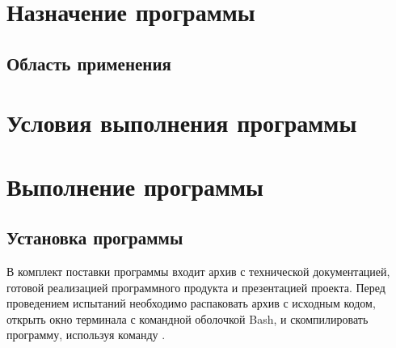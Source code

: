 \section{Назначение программы}


\subsection{Область применения}


\section{Условия выполнения программы}
{
  \renewcommand{\subsubsection}[1]{\subsection{#1}}
  
}

\section{Выполнение программы}
\subsection{Установка программы}
В комплект поставки программы входит архив с технической документацией, готовой реализацией программного продукта и презентацией проекта.
Перед проведением испытаний необходимо распаковать архив с исходным кодом, открыть окно терминала с командной оболочкой Bash, и скомпилировать программу, используя команду .

